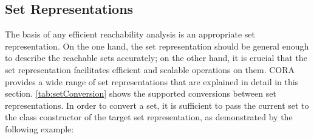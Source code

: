\subsection{Set Representations} \label{sec:setRepresentations}

The basis of any efficient reachability analysis is an appropriate set representation. On the one hand, the set representation should be general enough to describe the reachable sets accurately; on the other hand, it is crucial that the set representation facilitates efficient and scalable operations on them. CORA provides a wide range of set representations that are explained in detail in this section. \cref{tab:setConversion} shows the supported conversions between set representations. In order to convert a set, it is sufficient to pass the current set to the class constructor of the target set representation, as demonstrated by the following example:

    {\footnotesize }

